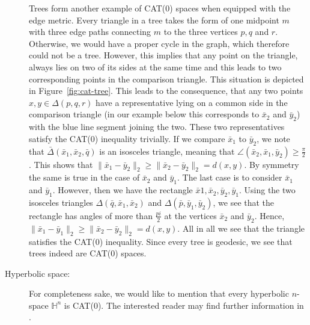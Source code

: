 \begin{bsp}
\begin{description}
    Trees form another example of CAT(0) spaces when equipped with the edge metric. Every triangle in a tree takes the form of one midpoint \(m\) with three edge paths connecting \(m\) to the three vertices \(p,q\) and \(r\). Otherwise, we would have a proper cycle in the graph, which therefore could not be a tree. However, this implies that any point on the triangle, always lies on two of its sides at the same time and this leads to two corresponding points in the comparison triangle. This situation is depicted in Figure~\ref{fig:cat-tree}. This leads to the consequence, that any two points \(x,y \in \Delta(p,q,r)\) have a representative lying on a common side in the comparison triangle (in our example below this corresponds to \(\bar x_2\) and \(\bar y_2\)) with the blue line segment joining the two. These two representatives satisfy the CAT(0) inequality trivially. If we compare \(\bar x_1\) to \(\bar y_2\), we note that \(\bar \Delta(\bar x_1, \bar x_2, \bar q)\) is an isosceles triangle, meaning that \(\angle(\bar x_2, \bar x_1, \bar y_2) \geq \frac{\pi}{2}\). This shows that \(\|\bar x_1 - \bar y_2\|_2 \geq \|\bar x_2 - \bar y_2\|_2 = d(x,y)\). By symmetry the same is true in the case of \(\bar x_2\) and \(\bar y_1\). The last case is to consider \(\bar x_1\) and \(\bar y_1\). However, then we have the rectangle \(\bar x1, \bar x_2, \bar y_2, \bar y_1\). Using the two isosceles triangles \(\Delta(\bar q, \bar x_1, \bar x_2)\) and \(\Delta(\bar p, \bar y_1, \bar y_2)\), we see that the rectangle has angles of more than \(\frac{pi}{2}\) at the vertices \(\bar x_2\) and \(\bar y_2\). Hence, \(\|\bar x_1 - \bar y_1 \|_2 \geq \|\bar x_2 - \bar y_2\|_2 = d(x,y)\). All in all we see that the triangle satisfies the CAT(0) inequality. Since every tree is geodesic, we see that trees indeed are CAT(0) spaces.
  \item[Hyperbolic space:] For completeness sake, we would like to mention that every hyperbolic \(n\)-space \(\mathbb{H}^n\) is CAT(0). The interested reader may find further information in \textcite[Section~II.1]{MR1744486}.
  \end{description}
\end{bsp}


